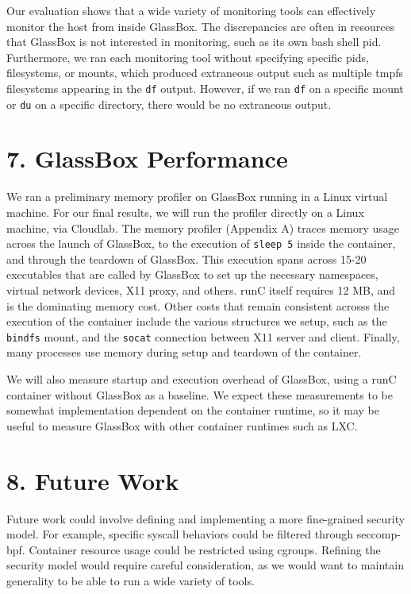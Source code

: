 \documentclass{proc}
\begin{document}
Our evaluation shows that a wide variety of monitoring tools can effectively monitor the host from inside GlassBox. The discrepancies are often in resources that GlassBox is not interested in monitoring, such as its own bash shell pid. Furthermore, we ran each monitoring tool without specifying specific pids, filesystems, or mounts, which produced extraneous output such as multiple tmpfs filesystems appearing in the \texttt{df} output. However, if we ran \texttt{df} on a specific mount or \texttt{du} on a specific directory, there would be no extraneous output.

\section*{7. GlassBox Performance}

We ran a preliminary memory profiler on GlassBox running in a Linux virtual machine. For our final results, we will run the profiler directly on a Linux machine, via Cloudlab. The memory profiler (Appendix A) traces memory usage across the launch of GlassBox, to the execution of \texttt{sleep 5} inside the container, and through the teardown of GlassBox. This execution spans across 15-20 executables that are called by GlassBox to set up the necessary namespaces, virtual network devices, X11 proxy, and others. runC itself requires 12 MB, and is the dominating memory cost. Other costs that remain consistent acrosss the execution of the container include the various structures we setup, such as the \texttt{bindfs} mount, and the \texttt{socat} connection between X11 server and client. Finally, many processes use memory during setup and teardown of the container.

We will also measure startup and execution overhead of GlassBox, using a runC container without GlassBox as a baseline. We expect these measurements to be somewhat implementation dependent on the container runtime, so it may be useful to measure GlassBox with other container runtimes such as LXC.

\section*{8. Future Work}
Future work could involve defining and implementing a more fine-grained security model. For example, specific syscall behaviors could be filtered through seccomp-bpf. Container resource usage could be restricted using cgroups. Refining the security model would require careful consideration, as we would want to maintain generality to be able to run a wide variety of tools.
\end{document}
